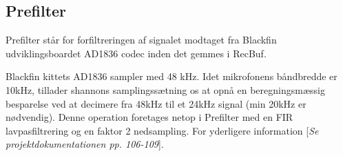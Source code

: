 \subsection{Prefilter}

Prefilter står for forfiltreringen af signalet modtaget fra Blackfin udviklingsboardet AD1836 codec inden det gemmes i RecBuf.

Blackfin kittets AD1836 sampler med 48 kHz. Idet mikrofonens båndbredde er 10kHz, tillader shannons samplingssætning os at opnå en beregningsmæssig besparelse ved at decimere fra 48kHz til et 24kHz signal (min 20kHz er nødvendig). Denne operation foretages netop i Prefilter med en FIR lavpasfiltrering og en faktor 2 nedsampling. For yderligere information [\textit{Se projektdokumentationen pp. 106-109}]. 